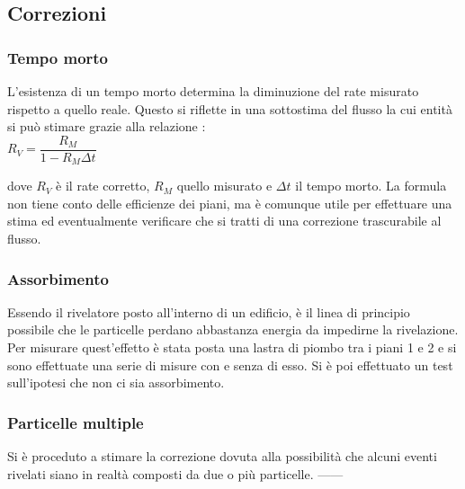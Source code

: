 \documentclass[11pt]{article}
\begin{document}
\begin{flushleft}
\subsection{Correzioni}
\subsubsection{Tempo morto}
L'esistenza di un tempo morto determina la diminuzione del rate misurato rispetto a quello reale. Questo si riflette in una sottostima del flusso la cui entità si può stimare grazie alla relazione \cite{correzione_tempomorto}: \\
$
R_V = \dfrac{R_M}{1-R_M \Delta t}
$

dove $R_V$ è il rate corretto, $R_M$ quello misurato e $\Delta t$ il tempo morto. La formula non tiene conto delle efficienze dei piani, ma è comunque utile per effettuare una stima ed eventualmente verificare che si tratti di una correzione trascurabile al flusso.

\subsubsection{Assorbimento}
Essendo il rivelatore posto all'interno di un edificio, è il linea di principio possibile che le particelle perdano abbastanza energia da impedirne la rivelazione. Per misurare quest'effetto è stata posta una lastra di piombo tra i piani 1 e 2 e si sono effettuate una serie di misure con e senza di esso. Si è poi effettuato un test sull'ipotesi che non ci sia assorbimento.

\subsubsection{Particelle multiple}
Si è proceduto a stimare la correzione dovuta alla possibilità che alcuni eventi rivelati siano in realtà composti da due o più particelle. 
------



\end{flushleft}
\end{document}
